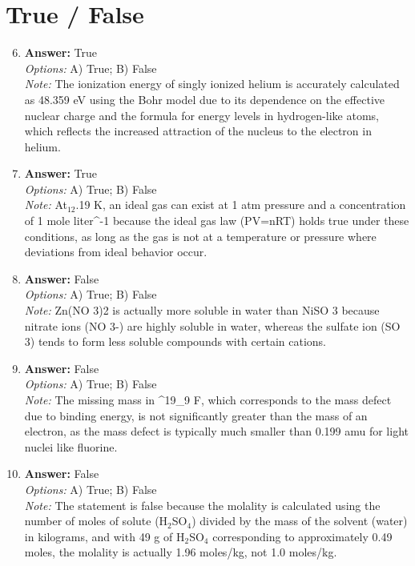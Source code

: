 \documentclass[12pt]{article}
\begin{document}
\section*{True / False}
\begin{enumerate}[label=\arabic*.]
\setcounter{enumi}{5}
\item \textbf{Answer:} True
\\ \textit{Options:} A) True; B) False
\\ \textit{Note:} The ionization energy of singly ionized helium is accurately calculated as 48.359 eV using the Bohr model due to its dependence on the effective nuclear charge and the formula for energy levels in hydrogen-like atoms, which reflects the increased attraction of the nucleus to the electron in helium.
\item \textbf{Answer:} True
\\ \textit{Options:} A) True; B) False
\\ \textit{Note:} At$_{12}$.19 K, an ideal gas can exist at 1 atm pressure and a concentration of 1 mole liter^-1 because the ideal gas law (PV=nRT) holds true under these conditions, as long as the gas is not at a temperature or pressure where deviations from ideal behavior occur.
\item \textbf{Answer:} False
\\ \textit{Options:} A) True; B) False
\\ \textit{Note:} Zn(NO 3)2 is actually more soluble in water than NiSO 3 because nitrate ions (NO 3-) are highly soluble in water, whereas the sulfate ion (SO 3) tends to form less soluble compounds with certain cations.
\item \textbf{Answer:} False
\\ \textit{Options:} A) True; B) False
\\ \textit{Note:} The missing mass in ^19\_9 F, which corresponds to the mass defect due to binding energy, is not significantly greater than the mass of an electron, as the mass defect is typically much smaller than 0.199 amu for light nuclei like fluorine.
\item \textbf{Answer:} False
\\ \textit{Options:} A) True; B) False
\\ \textit{Note:} The statement is false because the molality is calculated using the number of moles of solute (H$_{2}$SO$_{4}$) divided by the mass of the solvent (water) in kilograms, and with 49 g of H$_{2}$SO$_{4}$ corresponding to approximately 0.49 moles, the molality is actually 1.96 moles/kg, not 1.0 moles/kg.
\end{enumerate}
\end{document}
